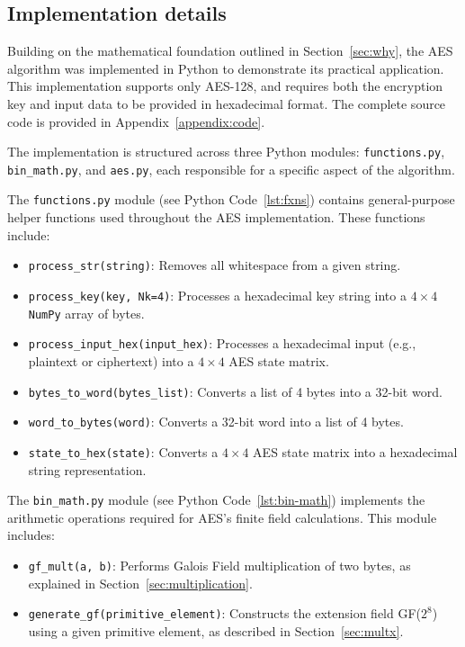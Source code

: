 \subsection{Implementation details}

Building on the mathematical foundation outlined in Section~\ref{sec:why}, the AES algorithm was implemented in Python to demonstrate its practical application.
This implementation supports only AES-128, and requires both the encryption key and input data to be provided in hexadecimal format. 
The complete source code is provided in Appendix~\ref{appendix:code}.

The implementation is structured across three Python modules: \texttt{functions.py}, \texttt{bin\_math.py}, and \texttt{aes.py}, each responsible for a specific aspect of the algorithm.

The \texttt{functions.py} module (see Python Code~\ref{lst:fxns}) contains general-purpose helper functions used throughout the AES implementation. 
These functions include:
\begin{itemize}
    \item \texttt{process\_str(string)}: Removes all whitespace from a given string.
    \item \texttt{process\_key(key, Nk=4)}: Processes a hexadecimal key string into a $4\times4$ \texttt{NumPy} array of bytes.
    \item \texttt{process\_input\_hex(input\_hex)}: Processes a hexadecimal input (e.g., plaintext or ciphertext) into a $4\times4$ AES state matrix.
    \item \texttt{bytes\_to\_word(bytes\_list)}: Converts a list of 4 bytes into a 32-bit word.
    \item \texttt{word\_to\_bytes(word)}: Converts a 32-bit word into a list of 4 bytes.
    \item \texttt{state\_to\_hex(state)}: Converts a $4\times4$ AES state matrix into a hexadecimal string representation.
\end{itemize}

The \texttt{bin\_math.py} module (see Python Code~\ref{lst:bin-math}) implements the arithmetic operations required for AES's finite field calculations. 
This module includes:
\begin{itemize}
    \item \texttt{gf\_mult(a, b)}: Performs Galois Field multiplication of two bytes, as explained in Section~\ref{sec:multiplication}.
    \item \texttt{generate\_gf(primitive\_element)}: Constructs the extension field GF($2^8$) using a given primitive element, as described in Section~\ref{sec:multx}.
\end{itemize}

